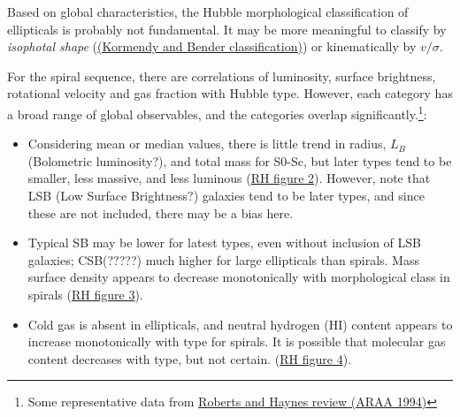 \documentclass{article}
\newcommand{\mynotes}[1]{\textcolor{cadmiumgreen}{#1}}
\begin{document}
Based on global characteristics, the Hubble morphological classification of
ellipticals is probably not fundamental. It may be more meaningful to classify
by \emph{isophotal shape}
(\href{http://astronomy.as.virginia.edu}{(Kormendy and Bender classification)})
or kinematically by $v/\sigma$.

For the spiral sequence, there are correlations of luminosity, surface
brightness, rotational velocity and gas fraction with Hubble type. However,
each category has a broad range of global observables, and the categories overlap
significantly.\footnote{Some representative data from
\href{http://adsabs.harvard.edu/cgi-bin/nph-bib_query?bibcode=1994ARA\%26A..32..115}
{Roberts and Haynes review (ARAA 1994)}}:
\begin{itemize}
    \item Considering mean or median values, there is little trend in
        radius, $L_{B}$ \mynotes{(Bolometric luminosity?)},
        and total mass for S0-Sc, but later types tend
        to be smaller, less massive, and less luminous
        (\href{http://astronomy.nmsu.edu/holtz/a555/html/diagrams/a616/rh2.htm}
        {{RH figure 2}}).
        However, note that LSB \mynotes{(Low Surface Brightness?)}
        galaxies tend to be later types, and
        since these are not included, there may be a bias here.
    \item Typical SB may be lower for latest types, even without inclusion
        of LSB galaxies; CSB(?????) much higher for large ellipticals than
        spirals. Mass surface density appears to decrease monotonically with
        morphological class in spirals
        (\href{http://astronomy.nmsu.edu/holtz/a555/html/diagrams/a616/rh3.htm}
        {{RH figure 3}}).
    \item Cold gas is absent in ellipticals, and neutral hydrogen (HI) content
        appears to increase monotonically with type for spirals. It is possible
        that molecular gas content decreases with type, but not certain.
        (\href{http://astronomy.nmsu.edu/holtz/a555/html/diagrams/a616/rh4.htm}
        {{RH figure 4}}).
\end{itemize}
\end{document}
